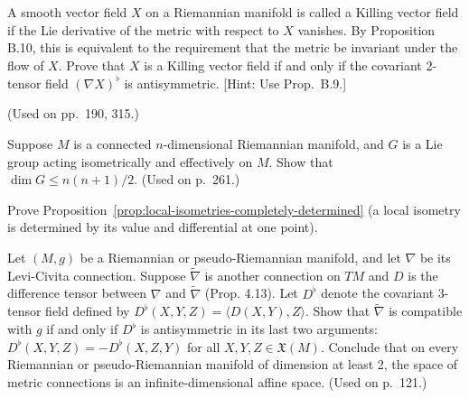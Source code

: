 \begin{exercise}
\label{prob:killing-vector-field}

A smooth vector field $X$ on a Riemannian manifold is called a Killing vector field if the Lie derivative of the metric with respect to $X$ vanishes. By Proposition B.10, this is equivalent to the requirement that the metric be invariant under the flow of $X$. Prove that $X$ is a Killing vector field if and only if the covariant 2-tensor field $(\nabla X)^\flat$ is antisymmetric. [Hint: Use Prop.\ B.9.]

(Used on pp.\ 190, 315.)
\end{exercise}

\begin{exercise}
\label{prob:lie-group-dimension-bound}

Suppose $M$ is a connected $n$-dimensional Riemannian manifold, and $G$ is a Lie group acting isometrically and effectively on $M$. Show that $\dim G \leq n(n+1)/2$. (Used on p.\ 261.)
\end{exercise}

\begin{exercise}
\label{prob:local-isometry-determined-point}

Prove Proposition~\ref{prop:local-isometries-completely-determined} (a local isometry is determined by its value and differential at one point).
\end{exercise}

\begin{exercise}
\label{prob:metric-connections-difference-tensor}

Let $(M,g)$ be a Riemannian or pseudo-Riemannian manifold, and let $\nabla$ be its Levi-Civita connection. Suppose $\tilde{\nabla}$ is another connection on $TM$ and $D$ is the difference tensor between $\nabla$ and $\tilde{\nabla}$ (Prop. 4.13). Let $D^\flat$ denote the covariant 3-tensor field defined by $D^\flat(X,Y,Z) = \langle D(X,Y),Z\rangle$. Show that $\tilde{\nabla}$ is compatible with $g$ if and only if $D^\flat$ is antisymmetric in its last two arguments: $D^\flat(X,Y,Z) = -D^\flat(X,Z,Y)$ for all $X,Y,Z \in \mathfrak{X}(M)$. Conclude that on every Riemannian or pseudo-Riemannian manifold of dimension at least 2, the space of metric connections is an infinite-dimensional affine space. (Used on p.\ 121.)
\end{exercise}

